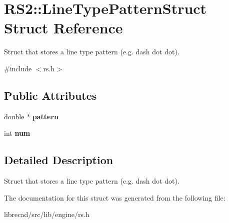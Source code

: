 \hypertarget{structRS2_1_1LineTypePatternStruct}{\section{R\-S2\-:\-:Line\-Type\-Pattern\-Struct Struct Reference}
\label{structRS2_1_1LineTypePatternStruct}
}


Struct that stores a line type pattern (e.\-g. dash dot dot).  




{\ttfamily \#include $<$rs.\-h$>$}

\subsection*{Public Attributes}
\begin{DoxyCompactItemize}
\item 
\hypertarget{structRS2_1_1LineTypePatternStruct_abf844bb6830be3c038b2acae7edf3743}{double $\ast$ {\bfseries pattern}}\label{structRS2_1_1LineTypePatternStruct_abf844bb6830be3c038b2acae7edf3743}

\item 
\hypertarget{structRS2_1_1LineTypePatternStruct_a0f3d9c29ed3c04c1ecdcff44ff2201e8}{int {\bfseries num}}\label{structRS2_1_1LineTypePatternStruct_a0f3d9c29ed3c04c1ecdcff44ff2201e8}

\end{DoxyCompactItemize}


\subsection{Detailed Description}
Struct that stores a line type pattern (e.\-g. dash dot dot). 

The documentation for this struct was generated from the following file\-:\begin{DoxyCompactItemize}
\item 
librecad/src/lib/engine/rs.\-h\end{DoxyCompactItemize}
